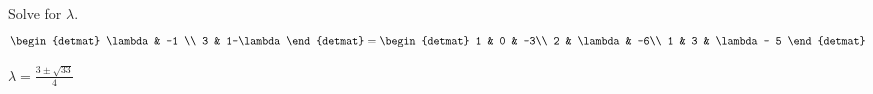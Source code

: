 
\begin{Exercise}[
name={},
title={}, 
difficulty=0,
origin={\cite{YL}}]
Solve for $\lambda$.
\[
\begin{detmat}
\lambda & -1 \\
3    & 1-\lambda
\end{detmat}
=
\begin{detmat}
1 & 0       & -3\\
2 & \lambda & -6\\
1 & 3       & \lambda - 5
\end{detmat}
\]

\end{Exercise}

\begin{Answer}
$\lambda=\frac{3\pm\sqrt{33}}{4}$

\end{Answer}
